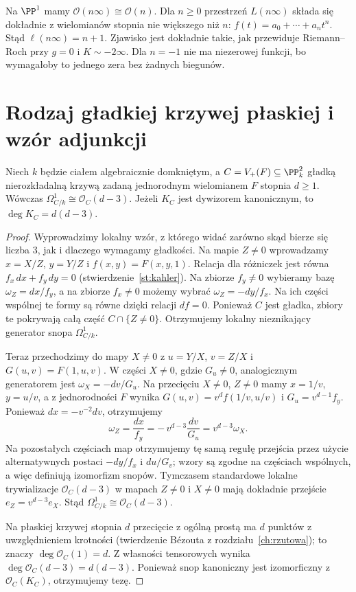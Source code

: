\begin{przyklad}
Na $\PP^1$ mamy $\mathcal O(n\infty)\cong\mathcal O(n)$.
Dla $n\ge0$ przestrzeń $L(n\infty)$ składa się
dokładnie z wielomianów stopnia nie większego niż $n$:
$f(t)=a_0+\cdots+a_nt^n$. Stąd $\ell(n\infty)=n+1$.
Zjawisko jest dokładnie takie, jak przewiduje Riemann--Roch
przy $g=0$ i $K\sim-2\infty$.
Dla $n=-1$ nie ma niezerowej funkcji, bo wymagałoby
to jednego zera bez żadnych biegunów.
\end{przyklad}

\section{Rodzaj gładkiej krzywej płaskiej i wzór adjunkcji}
\label{sec:genus-plane}

\begin{twierdzenie}
\label{tw:adjunction-plane}
Niech $k$ będzie ciałem algebraicznie domkniętym,
a $C=V_+(F)\subseteq\PP^2_k$ gładką nierozkładalną
krzywą zadaną jednorodnym wielomianem $F$
stopnia $d\ge1$. Wówczas
$\Omega^1_{C/k}\cong\mathcal O_C(d-3)$.
Jeżeli $K_C$ jest dywizorem kanonicznym,
to $\deg K_C=d(d-3)$.
\end{twierdzenie}
\begin{proof}
Wyprowadzimy lokalny wzór, z którego widać
zarówno skąd bierze się liczba $3$, jak i dlaczego
wymagamy gładkości. Na mapie $Z\ne0$ wprowadzamy
$x=X/Z$, $y=Y/Z$ i $f(x,y)=F(x,y,1)$.
Relacja dla różniczek jest równa
$f_x\,dx+f_y\,dy=0$ (stwierdzenie~\ref{st:kahler}).
Na zbiorze $f_y\ne0$ wybieramy bazę
$\omega_Z=dx/f_y$, a na zbiorze $f_x\ne0$
możemy wybrać $\omega_Z=-dy/f_x$.
Na ich części wspólnej te formy są równe
dzięki relacji $df=0$. Ponieważ $C$ jest gładka,
zbiory te pokrywają całą część $C\cap\{Z\ne0\}$.
Otrzymujemy lokalny nieznikający generator
snopa $\Omega^1_{C/k}$.

Teraz przechodzimy do mapy $X\ne0$ z
$u=Y/X$, $v=Z/X$ i $G(u,v)=F(1,u,v)$.
W części $X\ne0$, gdzie $G_u\ne0$,
analogicznym generatorem jest $\omega_X=-dv/G_u$.
Na przecięciu $X\ne0$, $Z\ne0$ mamy
$x=1/v$, $y=u/v$, a z jednorodności $F$ wynika
$G(u,v)=v^d f(1/v,u/v)$ i
$G_u=v^{d-1}f_y$.
Ponieważ $dx=-v^{-2}dv$, otrzymujemy
\[
 \omega_Z=\frac{dx}{f_y}
   =-\,v^{d-3}\frac{dv}{G_u}
   =v^{d-3}\omega_X.
\]
Na pozostałych częściach map otrzymujemy tę samą
regułę przejścia przez użycie alternatywnych
postaci $-dy/f_x$ i $du/G_v$; wzory są zgodne
na częściach wspólnych, a więc definiują
izomorfizm snopów. Tymczasem standardowe lokalne
trywializacje $\mathcal O_C(d-3)$ w mapach
$Z\ne0$ i $X\ne0$ mają dokładnie przejście
$e_Z=v^{d-3}e_X$. Stąd
$\Omega^1_{C/k}\cong\mathcal O_C(d-3)$.

Na płaskiej krzywej stopnia $d$ przecięcie
z ogólną prostą ma $d$ punktów z uwzględnieniem
krotności (twierdzenie Bézouta z
rozdziału~\ref{ch:rzutowa}); to znaczy
$\deg\mathcal O_C(1)=d$. Z własności tensorowych
wynika $\deg\mathcal O_C(d-3)=d(d-3)$.
Ponieważ snop kanoniczny jest izomorficzny
z $\mathcal O_C(K_C)$, otrzymujemy tezę.
\end{proof}

